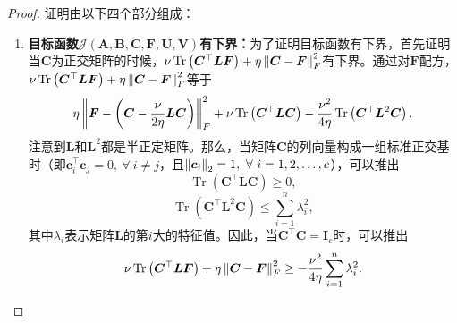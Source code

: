 \begin{proof}
证明由以下四个部分组成：
\begin{enumerate}[noitemsep]
    \item \textbf{目标函数$\mathcal{J}(\boldsymbol{A},\boldsymbol{B},\boldsymbol{C},\boldsymbol{F},\boldsymbol{U},\boldsymbol{V})$有下界：}为了证明目标函数有下界，首先证明当$\boldsymbol{C}$为正交矩阵的时候，$\nu\operatorname{Tr}\left(\boldsymbol{C}^{\top}\boldsymbol{L}\boldsymbol{F}\right)+\eta\left\lVert\boldsymbol{C}-\boldsymbol{F}\right\rVert_{F}^{2}$有下界。通过对$\boldsymbol{F}$配方，$\nu\operatorname{Tr}\left(\boldsymbol{C}^{\top}\boldsymbol{L}\boldsymbol{F}\right)+\eta\left\lVert\boldsymbol{C}-\boldsymbol{F}\right\rVert_{F}^{2}$等于
    \begin{equation*}
        \eta\left\lVert\boldsymbol{F}-\left(\boldsymbol{C}-\frac{\nu}{2\eta}\boldsymbol{L}\boldsymbol{C}\right)\right\rVert_{F}^{2}+\nu\operatorname{Tr}\left(\boldsymbol{C}^{\top}\boldsymbol{L}\boldsymbol{C}\right)-\frac{\nu^{2}}{4\eta}\operatorname{Tr}\left(\boldsymbol{C}^{\top}\boldsymbol{L}^{2}\boldsymbol{C}\right).
    \end{equation*}
    注意到$\boldsymbol{L}$和$\boldsymbol{L}^{2}$都是半正定矩阵。那么，当矩阵$\boldsymbol{C}$的列向量构成一组标准正交基时（即$\boldsymbol{c}_{i}^{\top}\boldsymbol{c}_{j}=0,~\forall~ i\neq j$，且$\left\lVert\boldsymbol{c}_{i}\right\rVert_{2}=1,~\forall~ i=1,2,\ldots,c$），可以推出
    \begin{equation*}
        \operatorname{Tr}(\boldsymbol{C}^{\top}\boldsymbol{L}\boldsymbol{C})\geq 0,
    \end{equation*}
    \begin{equation*}
        \operatorname{Tr}(\boldsymbol{C}^{\top}\boldsymbol{L}^{2}\boldsymbol{C})\leq \sum_{i=1}^{n}\lambda_{i}^{2},
    \end{equation*}
    其中$\lambda_{i}$表示矩阵$\boldsymbol{L}$的第$i$大的特征值。因此，当$\boldsymbol{C}^{\top}\boldsymbol{C}=\boldsymbol{I}_{c}$时，可以推出
    \begin{equation*}
        \nu\operatorname{Tr}\left(\boldsymbol{C}^{\top}\boldsymbol{L}\boldsymbol{F}\right)+\eta\left\lVert\boldsymbol{C}-\boldsymbol{F}\right\rVert_{F}^{2}\geq -\frac{\nu^{2}}{4\eta}\sum_{i=1}^{n}\lambda_{i}^{2}.
    \end{equation*}

\end{enumerate}
\end{proof}

